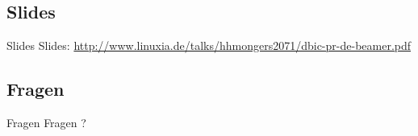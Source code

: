 \subsection{Slides}

\begin{frame}{Slides}
Slides:
\url{http://www.linuxia.de/talks/hhmongers2071/dbic-pr-de-beamer.pdf}
\end{frame}

\subsection{Fragen}

\begin{frame}{Fragen}
\centering
Fragen ?
\end{frame}



